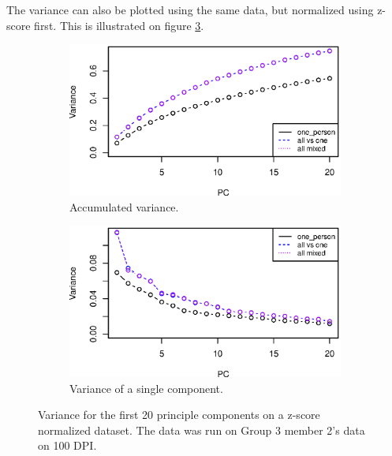 The variance can also be plotted using the same data, but normalized using z-score first.
This is illustrated on figure \ref{fig:variance_zscore}.




\begin{figure}[H]
\centering
\begin{subfigure}{0.49\textwidth}
\includegraphics[width=\textwidth]{graphics/pca_acc_variance_zs}
\caption{Accumulated variance.}
\label{fig:pca_accumulated_var_zscore}
\end{subfigure}
\begin{subfigure}{0.49\textwidth}
\includegraphics[width=\textwidth]{graphics/pca_variance_zs}
\caption{Variance of a single component.}
\label{fig:pca_var_zscore}
\end{subfigure}
\caption[PCA variance when data is normalized using z-score.]{Variance for the first 20 principle components on a z-score normalized dataset.
The data was run on Group 3 member 2's data on 100 DPI. }
\label{fig:variance_zscore}
\end{figure}

